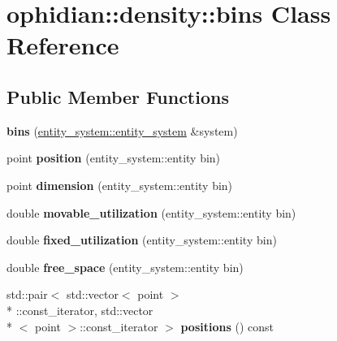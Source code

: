 \hypertarget{classophidian_1_1density_1_1bins}{\section{ophidian\-:\-:density\-:\-:bins Class Reference}
\label{classophidian_1_1density_1_1bins}
}
\subsection*{Public Member Functions}
\begin{DoxyCompactItemize}
\item 
\hypertarget{classophidian_1_1density_1_1bins_aab38895a5a509f4bf4999e45ff1db909}{{\bfseries bins} (\hyperlink{classophidian_1_1entity__system_1_1entity__system}{entity\-\_\-system\-::entity\-\_\-system} \&system)}\label{classophidian_1_1density_1_1bins_aab38895a5a509f4bf4999e45ff1db909}

\item 
\hypertarget{classophidian_1_1density_1_1bins_ac4a4ab3f57df8a5b80d28bb1f29e037c}{point {\bfseries position} (entity\-\_\-system\-::entity bin)}\label{classophidian_1_1density_1_1bins_ac4a4ab3f57df8a5b80d28bb1f29e037c}

\item 
\hypertarget{classophidian_1_1density_1_1bins_a7ad64af996e80ad3b4f24cf1a968e358}{point {\bfseries dimension} (entity\-\_\-system\-::entity bin)}\label{classophidian_1_1density_1_1bins_a7ad64af996e80ad3b4f24cf1a968e358}

\item 
\hypertarget{classophidian_1_1density_1_1bins_a26f1ec5b86d2cdbb60bf4a879d4e6bae}{double {\bfseries movable\-\_\-utilization} (entity\-\_\-system\-::entity bin)}\label{classophidian_1_1density_1_1bins_a26f1ec5b86d2cdbb60bf4a879d4e6bae}

\item 
\hypertarget{classophidian_1_1density_1_1bins_a16050226630ca71e9ea42fb04d39fb49}{double {\bfseries fixed\-\_\-utilization} (entity\-\_\-system\-::entity bin)}\label{classophidian_1_1density_1_1bins_a16050226630ca71e9ea42fb04d39fb49}

\item 
\hypertarget{classophidian_1_1density_1_1bins_ab3d57d6f01e5d3eea255b519bdd2a6a7}{double {\bfseries free\-\_\-space} (entity\-\_\-system\-::entity bin)}\label{classophidian_1_1density_1_1bins_ab3d57d6f01e5d3eea255b519bdd2a6a7}

\item 
\hypertarget{classophidian_1_1density_1_1bins_a792deee9e1a5fd4370cc6f9f65cafd07}{std\-::pair$<$ std\-::vector$<$ point $>$\\*
\-::const\-\_\-iterator, std\-::vector\\*
$<$ point $>$\-::const\-\_\-iterator $>$ {\bfseries positions} () const }\label{classophidian_1_1density_1_1bins_a792deee9e1a5fd4370cc6f9f65cafd07}


\end{DoxyCompactItemize}
